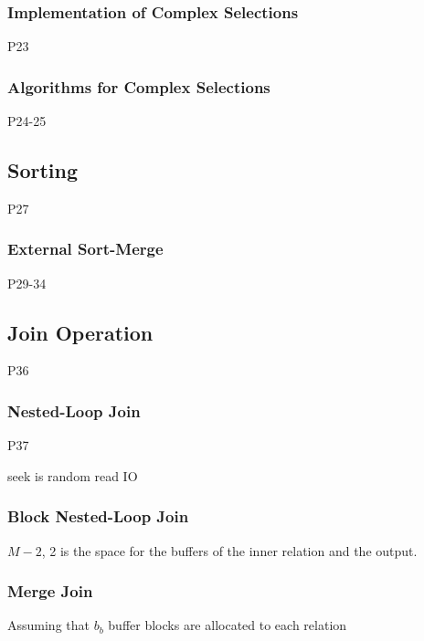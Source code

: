 \subsubsection{Implementation of Complex Selections}
 P23

\subsubsection{Algorithms for Complex Selections}
 P24-25

\subsection{Sorting}
 P27

\subsubsection{External Sort-Merge}
 P29-34

\subsection{Join Operation}
 P36
\subsubsection{Nested-Loop Join}
 P37

seek is random read IO

\subsubsection{Block Nested-Loop Join}
$M-2$, 2 is the space for the buffers of the inner relation and the output.

\subsubsection{Merge Join}
Assuming that $b_b$ buffer blocks are allocated to each relation